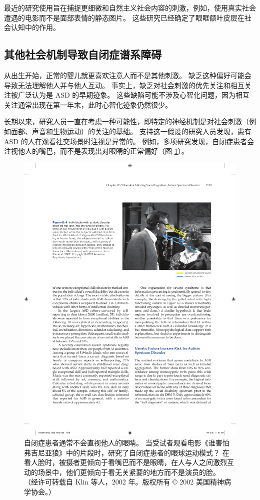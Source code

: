 最近的研究使用旨在捕捉更细微和自然主义社会内容的刺激，例如，使用真实社会遭遇的电影而不是面部表情的静态图片。 这些研究已经确定了眼眶额叶皮层在社会认知中的作用。


\subsection{其他社会机制导致自闭症谱系障碍}


从出生开始，正常的婴儿就更喜欢注意人而不是其他刺激。 缺乏这种偏好可能会导致无法理解他人并与他人互动。 事实上，缺乏对社会刺激的优先关注和相互关注被广泛认为是 ASD 的早期迹象。 这些缺陷可能不涉及心智化问题，因为相互关注通常出现在第一年末，此时心智化迹象仍然很少。

长期以来，研究人员一直在考虑一种可能性，即特定的神经机制是对社会刺激（例如面部、声音和生物运动）的关注的基础。 支持这一假设的研究人员发现，患有 ASD 的人在观看社交场景时注视是异常的。 例如，多项研究发现，自闭症患者会注视他人的嘴巴，而不是表现出对眼睛的正常偏好（图 \ref{fig:62_5}）。

\begin{figure}[htbp]
	\centering
	\includegraphics[width=0.65\linewidth]{chap62/fig_62_5}
	\caption{自闭症患者通常不会直视他人的眼睛。 当受试者观看电影《谁害怕弗吉尼亚狼》中的片段时，研究了自闭症患者的眼球运动模式？ 在看人脸时，被摄者更倾向于看嘴巴而不是眼睛，在人与人之间激烈互动的场景中，他们更倾向于看无关紧要的地方而不是演员的脸。 （经许可转载自 Klin 等人，2002 年。版权所有 © 2002 美国精神病学协会。）}
	\label{fig:62_5}
\end{figure}

